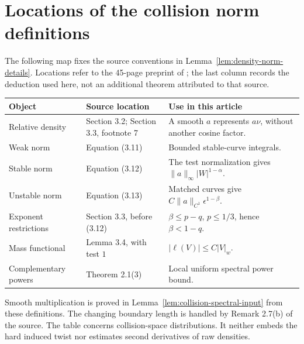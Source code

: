 \section{Locations of the collision norm definitions}
\label{app:collision-norm-map}
The following map fixes the source conventions in
Lemma~\ref{lem:density-norm-details}. Locations refer to the 45-page
preprint of \cite{DZ}; the last column records the deduction used here,
not an additional theorem attributed to that source.

\begin{center}
\renewcommand{\arraystretch}{1.2}
\begin{tabular}{>{\raggedright\arraybackslash}p{}>{\raggedright\arraybackslash}p{}>{\raggedright\arraybackslash}p{}}
Object & Source location & Use in this article\\ \hline
Relative density & Section 3.2; Section 3.3, footnote 7 & A smooth $a$
represents $a\nu$, without another cosine factor.\\
Weak norm & Equation (3.11) & Bounded stable-curve integrals.\\
Stable norm & Equation (3.12) & The test normalization gives
$\|a\|_\infty |W|^{1-\alpha}$.\\
Unstable norm & Equation (3.13) & Matched curves give
$C\|a\|_{C^1}\epsilon^{1-\beta}$.\\
Exponent restrictions & Section 3.3, before (3.12) &
$\beta\le p-q$, $p\le1/3$, hence $\beta<1-q$.\\
Mass functional & Lemma 3.4, with test $1$ &
$|\ell(V)|\le C|V|_w$.\\
Complementary powers & Theorem 2.1(3) &
Local uniform spectral power bound.
\end{tabular}
\end{center}

Smooth multiplication is proved in
Lemma~\ref{lem:collision-spectral-input} from these definitions.
The changing boundary length is handled by Remark 2.7(b) of the source.
The table concerns collision-space distributions. It neither embeds the
hard induced twist nor estimates second derivatives of raw densities.
